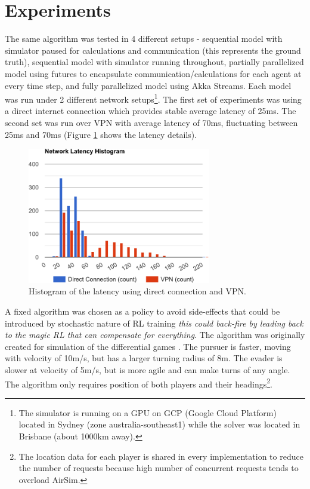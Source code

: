 \documentclass{article}
\let\cite\citep
\begin{document}
\section{Experiments}
The same algorithm was tested in 4 different setups - sequential model with simulator paused for calculations and communication (this represents the ground truth), sequential model with simulator running throughout, partially parallelized model using futures to encapsulate communication/calculations for each agent at every time step, and fully parallelized model using Akka Streams. Each model was run under 2 different network setups\footnote{The simulator is running on a GPU on GCP (Google Cloud Platform) located in Sydney (zone australia-southeast1) while the solver was located in Brisbane (about 1000km away).}. The first set of experiments was using a direct internet connection which provides stable average latency of 25ms. The second set was run over VPN with average latency of 70ms, fluctuating between 25ms and 70ms (Figure \ref{fig:network-latency} shows the latency details).

\begin{figure}
	\centering
	\includegraphics[width=8.0cm]{network-latency}
	\caption{Histogram of the latency using direct connection and VPN.}\label{fig:network-latency}
\end{figure}

A fixed algorithm was chosen as a policy to avoid side-effects that could be introduced by stochastic nature of RL training \emph{this could back-fire by leading back to the magic RL that can compensate for everything}. The algorithm was originally created for simulation of the differential games \cite{anne-paper}. The pursuer is faster, moving with velocity of 10m/s, but has a larger turning radius of 8m. The evader is slower at velocity of 5m/s, but is more agile and can make turns of any angle. The algorithm only requires position of both players and their headings\footnote{The location data for each player is shared in every implementation to reduce the number of requests because high number of concurrent requests tends to overload AirSim.}. 
\end{document}
